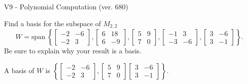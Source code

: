 \begin{exercise}
  \begin{exerciseTitle}V9 - Polynomial Computation (ver. 680)\end{exerciseTitle}
  \begin{exerciseStatement}
    Find a basis for the subspace of \(M_{2,2}\) 
\[W=\mathrm{span}\ \left\{\left[\begin{array}{cc}
-2 & -6 \\
-2 & 3
\end{array}\right] , \left[\begin{array}{cc}
6 & 18 \\
6 & -9
\end{array}\right] , \left[\begin{array}{cc}
5 & 9 \\
7 & 0
\end{array}\right] , \left[\begin{array}{cc}
-1 & 3 \\
-3 & -6
\end{array}\right] , \left[\begin{array}{cc}
3 & -6 \\
3 & -1
\end{array}\right]\right\}.\]
 Be sure to explain why your result is a basis.


  \end{exerciseStatement}
  \begin{exerciseAnswer}
   A basis of \(W\) is  \(\left\{\left[\begin{array}{cc}
-2 & -6 \\
-2 & 3
\end{array}\right] , \left[\begin{array}{cc}
5 & 9 \\
7 & 0
\end{array}\right] \left[\begin{array}{cc}
3 & -6 \\
3 & -1
\end{array}\right]\right\}\).
  


  \end{exerciseAnswer}
\end{exercise}